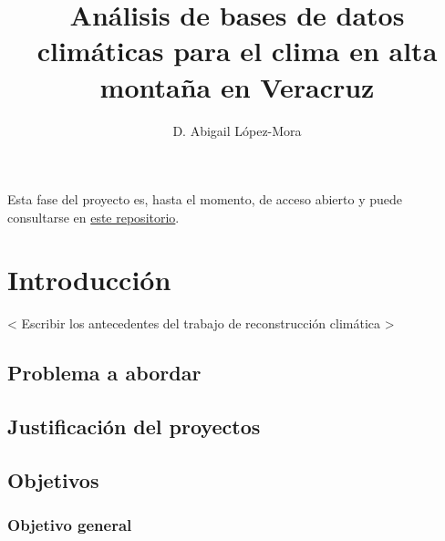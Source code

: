 \documentclass[
  spanish,
  letterpaper,
  DIV=11,
  numbers=noendperiod]{scrartcl}
\title{Análisis de bases de datos climáticas para el clima en alta
montaña en Veracruz}
\author{D. Abigail López-Mora}
\date{}
\renewcommand*\contentsname{Tabla de contenidos}
\newcommand\contentsname{Tabla de contenidos}
\begin{document}
\maketitle

\renewcommand*\contentsname{Contenido}
{
\hypersetup{linkcolor=black}
\setcounter{tocdepth}{2}
\tableofcontents
}

\begin{tcolorbox}[enhanced jigsaw, arc=.35mm, bottomrule=.15mm, bottomtitle=1mm, breakable, colback=white, colbacktitle=quarto-callout-tip-color!10!white, colframe=quarto-callout-tip-color-frame, coltitle=black, left=2mm, leftrule=.75mm, opacityback=0, opacitybacktitle=0.6, rightrule=.15mm, title=\textcolor{quarto-callout-tip-color}{\faLightbulb}\hspace{0.5em}{Tip}, titlerule=0mm, toprule=.15mm, toptitle=1mm]

Esta fase del proyecto es, hasta el momento, de acceso abierto y puede
consultarse en
\href{https://github.com/abigail-nc/BD-analysis-Pico}{este repositorio}.

\end{tcolorbox}

\section{Introducción}\label{introducciuxf3n}

\textless{} Escribir los antecedentes del trabajo de reconstrucción
climática \textgreater{}

\subsection{Problema a abordar}\label{problema-a-abordar}

\subsection{Justificación del
proyectos}\label{justificaciuxf3n-del-proyectos}

\subsection{Objetivos}\label{objetivos}

\subsubsection{Objetivo general}\label{objetivo-general}
\end{document}

